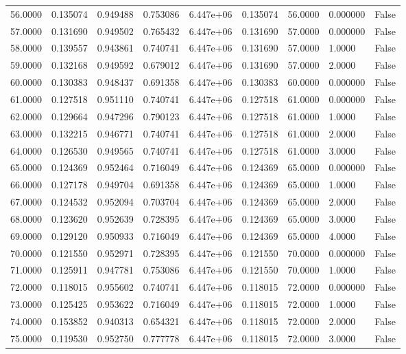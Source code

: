 \documentclass[11pt]{report}
\begin{document}
\begin{longtable}{lllllllll}
56.0000 & 0.135074 & 0.949488 & 0.753086 & 6.447e+06 & 0.135074 & 56.0000 & 0.000000 & False \\
57.0000 & 0.131690 & 0.949502 & 0.765432 & 6.447e+06 & 0.131690 & 57.0000 & 0.000000 & False \\
58.0000 & 0.139557 & 0.943861 & 0.740741 & 6.447e+06 & 0.131690 & 57.0000 & 1.0000 & False \\
59.0000 & 0.132168 & 0.949592 & 0.679012 & 6.447e+06 & 0.131690 & 57.0000 & 2.0000 & False \\
60.0000 & 0.130383 & 0.948437 & 0.691358 & 6.447e+06 & 0.130383 & 60.0000 & 0.000000 & False \\
61.0000 & 0.127518 & 0.951110 & 0.740741 & 6.447e+06 & 0.127518 & 61.0000 & 0.000000 & False \\
62.0000 & 0.129664 & 0.947296 & 0.790123 & 6.447e+06 & 0.127518 & 61.0000 & 1.0000 & False \\
63.0000 & 0.132215 & 0.946771 & 0.740741 & 6.447e+06 & 0.127518 & 61.0000 & 2.0000 & False \\
64.0000 & 0.126530 & 0.949565 & 0.740741 & 6.447e+06 & 0.127518 & 61.0000 & 3.0000 & False \\
65.0000 & 0.124369 & 0.952464 & 0.716049 & 6.447e+06 & 0.124369 & 65.0000 & 0.000000 & False \\
66.0000 & 0.127178 & 0.949704 & 0.691358 & 6.447e+06 & 0.124369 & 65.0000 & 1.0000 & False \\
67.0000 & 0.124532 & 0.952094 & 0.703704 & 6.447e+06 & 0.124369 & 65.0000 & 2.0000 & False \\
68.0000 & 0.123620 & 0.952639 & 0.728395 & 6.447e+06 & 0.124369 & 65.0000 & 3.0000 & False \\
69.0000 & 0.129120 & 0.950933 & 0.716049 & 6.447e+06 & 0.124369 & 65.0000 & 4.0000 & False \\
70.0000 & 0.121550 & 0.952971 & 0.728395 & 6.447e+06 & 0.121550 & 70.0000 & 0.000000 & False \\
71.0000 & 0.125911 & 0.947781 & 0.753086 & 6.447e+06 & 0.121550 & 70.0000 & 1.0000 & False \\
72.0000 & 0.118015 & 0.955602 & 0.740741 & 6.447e+06 & 0.118015 & 72.0000 & 0.000000 & False \\
73.0000 & 0.125425 & 0.953622 & 0.716049 & 6.447e+06 & 0.118015 & 72.0000 & 1.0000 & False \\
74.0000 & 0.153852 & 0.940313 & 0.654321 & 6.447e+06 & 0.118015 & 72.0000 & 2.0000 & False \\
75.0000 & 0.119530 & 0.952750 & 0.777778 & 6.447e+06 & 0.118015 & 72.0000 & 3.0000 & False \\

\end{longtable}
\end{document}
